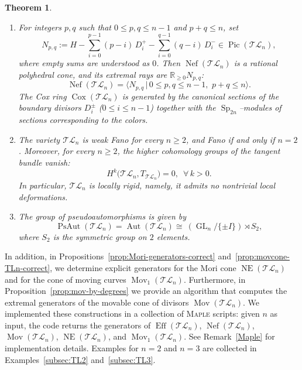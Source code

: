 \documentclass[10pt]{amsart}
\theoremstyle{definition}
\newcommand{\Pic}{\operatorname{Pic}}
\newcommand{\Eff}{\operatorname{Eff}}
\newcommand{\Nef}{\operatorname{Nef}}
\newcommand{\Mov}{\operatorname{Mov}}
\newcommand{\PsAut}{\operatorname{PsAut}}
\newcommand{\Aut}{\operatorname{Aut}}
\DeclareMathOperator{\Cox}{Cox}
\DeclareMathOperator{\NE}{NE}
\DeclareMathOperator{\Sp}{Sp}
\newcommand{\TL}{\mathcal{TL}}
\newcommand{\GL}{\operatorname{GL}}
\theoremstyle{plain} %
\newtheorem{theoremABC}{Theorem}
\begin{document}
\begin{theoremABC}
\begin{enumerate}
\item For integers $p,q$ such that $0\le p,q\le n-1$ and $p+q\le n$, set
\begin{equation}\label{npq}
N_{p,q}:= H-\sum_{i=0}^{p-1}(p-i)\,D_i^+-\sum_{i=0}^{q-1}(q-i)\,D_i^-\in \Pic(\TL_n),
\end{equation}
where empty sums are understood as $0$. Then $\Nef(\TL_n)$ is a rational polyhedral cone, and its extremal rays are $\mathbb{R}_{\geq 0}N_{p,q}$:
\[
\Nef(\TL_n)=\bigl\langle N_{p,q}\, \big| \,0\le p,q\le n-1,\,\, p+q\le n\bigr\rangle.
\]
The Cox ring $\Cox(\TL_n)$ is generated by the canonical sections of the boundary divisors $D_i^\pm$ ($0\le i\le n-1$) together with the $\Sp_{2n}$--modules of sections corresponding to the colors.

\item The variety $\TL_n$ is weak Fano for every $n\ge 2$, and Fano if and only if $n=2$. Moreover,  for every $n\ge 2$, the higher cohomology groups of the tangent bundle vanish:
\[
H^k\bigl(\TL_n,T_{\TL_n}\bigr)=0,\,\,\,\forall\,k>0.
\]
In particular, $\TL_n$ is locally rigid, namely, it admits no nontrivial local deformations.

\item The group of pseudoautomorphisms is given by
\[
\PsAut(\TL_n)=\Aut(\TL_n) \cong\ (\GL_n/\{\pm I\})\rtimes S_2,
\]
where $S_2$ is the symmetric group on $2$ elements.
\end{enumerate}
\end{theoremABC}


In addition, in Propositions~\ref{prop:Mori-generators-correct} and~\ref{prop:movcone-TLn-correct}, we determine explicit generators for the Mori cone $\NE(\TL_n)$ and for the cone of moving curves $\Mov_1(\TL_n)$. Furthermore, in Proposition~\ref{prop:mov-by-degrees} we provide an algorithm that computes the extremal generators of the movable cone of divisors $\Mov(\TL_n)$. We implemented these constructions in a collection of \textsc{Maple} scripts: given $n$ as input, the code returns the generators of $\Eff(\TL_n)$, $\Nef(\TL_n)$, $\Mov(\TL_n)$, $\NE(\TL_n)$, and $\Mov_1(\TL_n)$. See Remark~\ref{Maple} for implementation details. Examples for $n=2$ and $n=3$ are collected in Examples~\ref{subsec:TL2} and~\ref{subsec:TL3}. %
\end{document}
